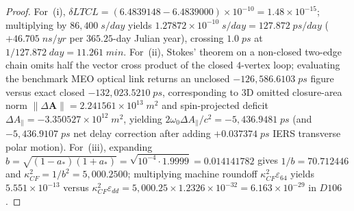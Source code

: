 \documentclass[11pt,a4paper,reqno]{article}
\def\mathrm#1{#1}%
\def\mathbb#1{#1}%
\def\Done{D106}%
\def\LTCL{LTCL}%
\theoremstyle{plain}
\theoremstyle{definition}
\theoremstyle{remark}
\numberwithin{equation}{section}
\numberwithin{table}{section}
\newcommand{\Done}{\mathbb{D}_{106}}
\newcommand{\LTCL}{L_{\mathrm{TCL}}}
\begin{document}
\begin{proof}
For~(i), $\delta\LTCL = (6.4839148 - 6.4839000)\times 10^{-10} = 1.48\times 10^{-15}$; multiplying by $86{,}400\;\mathrm{s/day}$ yields $1.27872 \times 10^{-10}\;\mathrm{s/day} = 127.872\;\mathrm{ps/day}$ ($+46.705\;\mathrm{ns/yr}$ per $365.25$-day Julian year), crossing $1.0\;\mathrm{ps}$ at $1 / 127.872\;\mathrm{day} = 11.261\;\mathrm{min}$. For~(ii), Stokes' theorem on a non-closed two-edge chain omits half the vector cross product of the closed $4$-vertex loop; evaluating the benchmark MEO optical link returns an unclosed $-126{,}586.6103\;\mathrm{ps}$ figure versus exact closed $-132{,}023.5210\;\mathrm{ps}$, corresponding to 3D omitted closure-area norm $\|\Delta\mathbf{A}\| = 2.241561\times 10^{13}\;\mathrm{m}^2$ and spin-projected deficit $\Delta A_\parallel = -3.350527 \times 10^{12}\;\mathrm{m}^2$, yielding $2\omega_0 \Delta A_\parallel / c^2 = -5{,}436.9481\;\mathrm{ps}$ (and $-5{,}436.9107\;\mathrm{ps}$ net delay correction after adding $+0.037374\;\mathrm{ps}$ IERS transverse polar motion). For~(iii), expanding $b = \sqrt{(1-a_*)(1+a_*)} = \sqrt{10^{-4}\cdot 1.9999} = 0.014141782$ gives $1/b = 70.712446$ and $\kappa_{\mathrm{CF}}^2 = 1/b^2 = 5{,}000.2500$; multiplying machine roundoff $\kappa_{\mathrm{CF}}^2 \varepsilon_{64}$ yields $5.551 \times 10^{-13}$ versus $\kappa_{\mathrm{CF}}^2 \varepsilon_{\mathrm{dd}} = 5{,}000.25 \times 1.2326 \times 10^{-32} = 6.163 \times 10^{-29}$ in $\Done$.
\end{proof}
\end{document}
